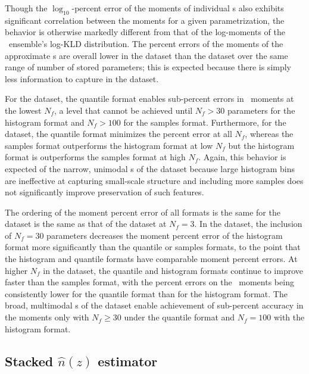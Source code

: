Though the $\log_{10}$-percent error of the moments of individual \pz s also 
exhibits significant correlation between the moments for a given 
parametrization, the behavior is otherwise markedly different from that of the 
log-moments of the \pz\ ensemble's log-KLD distribution.
The percent errors of the moments of the approximate \pz s are overall lower in 
the \mgdata dataset than the \ssdata dataset over the same range of number of 
stored parameters; this is expected because there is simply less information to 
capture in the \mgdata dataset.

For the \mgdata dataset, the quantile format enables sub-percent errors in \pz\ 
moments at the lowest $N_{f}$, a level that cannot be achieved until $N_{f}>30$ 
parameters for the histogram format and $N_{f}>100$ for the samples format.
Furthermore, for the \mgdata dataset, the quantile format minimizes the percent 
error at all $N_{f}$, whereas the samples format outperforms the histogram 
format at low $N_{f}$ but the histogram format is outperforms the samples 
format at high $N_{f}$.
Again, this behavior is expected of the narrow, unimodal \pz s of the \mgdata 
dataset because large histogram bins are ineffective at capturing small-scale 
structure and including more samples does not significantly improve 
preservation of such features.

The ordering of the moment percent error of all formats is the same for the 
\ssdata dataset is the same as that of the \mgdata dataset at $N_{f}=3$.
In the \ssdata dataset, the inclusion of $N_{f}=30$ parameters decreases the 
moment percent error of the histogram format more significantly than the 
quantile or samples formats, to the point that the histogram and quantile 
formats have comparable moment percent errors.
At higher $N_{f}$ in the \ssdata dataset, the quantile and histogram formats 
continue to improve faster than the samples format, with the percent errors on 
the \pz\ moments being consistently lower for the quantile format than for the 
histogram format.
The broad, multimodal \pz s of the \ssdata dataset enable achievement of 
sub-percent accuracy in the moments only with $N_{f}\geq30$ under the quantile 
format and $N_{f}=100$ with the histogram format.

\subsection{Stacked $\hat{n}(z)$ estimator}

